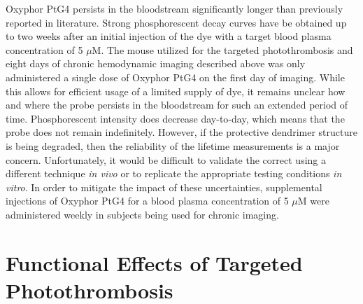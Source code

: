 Oxyphor PtG4 persists in the bloodstream significantly longer than previously reported in literature. Strong phosphorescent decay curves have be obtained up to two weeks after an initial injection of the dye with a target blood plasma concentration of 5 $\mu$M. The mouse utilized for the targeted photothrombosis and eight days of chronic hemodynamic imaging described above was only administered a single dose of Oxyphor PtG4 on the first day of imaging. While this allows for efficient usage of a limited supply of dye, it remains unclear how and where the probe persists in the bloodstream for such an extended period of time. Phosphorescent intensity does decrease day-to-day, which means that the probe does not remain indefinitely. However, if the protective dendrimer structure is being degraded, then the reliability of the lifetime measurements is a major concern. Unfortunately, it would be difficult to validate the correct  using a different technique \textit{in vivo} or to replicate the appropriate testing conditions \textit{in vitro}. In order to mitigate the impact of these uncertainties, supplemental injections of Oxyphor PtG4 for a blood plasma concentration of 5 $\mu$M were administered weekly in subjects being used for chronic imaging.



\section{Functional Effects of Targeted Photothrombosis}

